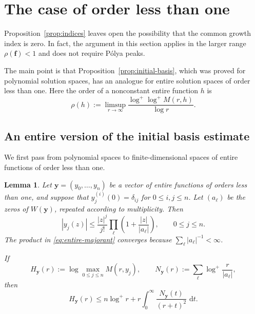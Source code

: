 \documentclass[12pt,letterpaper,reqno]{amsart}
\newtheorem{lem}[thm]{Lemma}
\theoremstyle{definition}
\numberwithin{equation}{section}
\newcommand{\dd}{\,\mathrm d}
\newcommand{\fv}{\bm f}
\newcommand{\yv}{\bm y}
\begin{document}
\section{The case of order less than one}\label{sec:smallorder}

Proposition~\ref{prop:indices} leaves open the possibility that the
common growth index is zero. In fact, the argument in this section
applies in the larger range \(\rho(\fv)<1\) and does not require
P\'olya peaks.

The main point is that Proposition~\ref{prop:initial-basis}, which was
proved for polynomial solution spaces, has an analogue for entire
solution spaces of order less than one. Here the order of a
nonconstant entire function \(h\) is
\[
 \rho(h)
 :=
 \limsup_{r\to\infty}
 \frac{\log^+\log^+M(r,h)}{\log r}.
\]


\subsection{An entire version of the initial basis estimate}

We first pass from polynomial spaces to finite-dimensional spaces of
entire functions of order less than one.

\begin{lem}\label{lem:entire-majorant}
Let \(\yv=(y_0,\ldots,y_{n})\) be a vector of entire functions of
orders less than one, and suppose that
\(y_j^{(i)}(0)=\delta_{ij}\) for \(0\leq i,j\leq n\).
Let \((a_\ell)\) be the zeros of \(W(\yv)\), repeated according to
multiplicity. Then
\begin{equation}\label{eq:entire-majorant}
 |y_j(z)|
 \leq
 \frac{|z|^j}{j!}
 \prod_\ell
 \left(1+\frac{|z|}{|a_\ell|}\right),
 \qquad
 0\leq j\leq n.
\end{equation}
The product in \eqref{eq:entire-majorant} converges because
\(\sum_\ell|a_\ell|^{-1}<\infty\).

If
\[
 H_{\yv}(r)
 :=
 \log\max_{0\leq j\leq n}M(r,y_j),
 \qquad
 N_{\yv}(r)
 :=
 \sum_\ell\log^+\frac{r}{|a_\ell|},
\]
then
\begin{equation}\label{eq:convolution}
 H_{\yv}(r)
 \leq
 n\log^+r
 +
 r\int_0^\infty
 \frac{N_{\yv}(t)}{(r+t)^2}\,\dd t.
\end{equation}
\end{lem}
\end{document}
